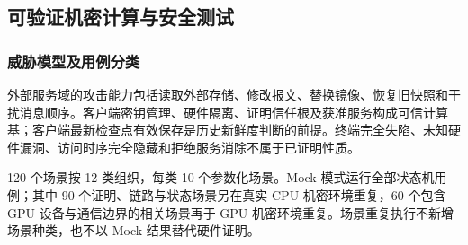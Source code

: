 \subsection{可验证机密计算与安全测试}\label{section:3.9}

\subsubsection{威胁模型及用例分类}\label{section:3.9.1}

外部服务域的攻击能力包括读取外部存储、修改报文、替换镜像、恢复旧快照和干扰消息顺序。客户端密钥管理、硬件隔离、证明信任根及获准服务构成可信计算基；客户端最新检查点有效保存是历史新鲜度判断的前提。终端完全失陷、未知硬件漏洞、访问时序完全隐藏和拒绝服务消除不属于已证明性质。

120 个场景按 12 类组织，每类 10 个参数化场景。Mock 模式运行全部状态机用例；其中 90 个证明、链路与状态场景另在真实 CPU 机密环境重复，60 个包含 GPU 设备与通信边界的相关场景再于 GPU 机密环境重复。场景重复执行不新增场景种类，也不以 Mock 结果替代硬件证明。

